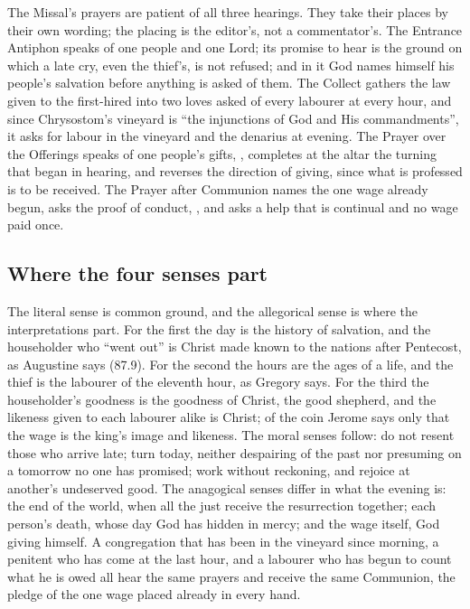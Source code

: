 The Missal's prayers are patient of all three hearings. They take their
places by their own wording; the placing is the editor's, not a
commentator's. The Entrance Antiphon speaks
of one people and one Lord; its promise to hear is the ground on which a late
cry, even the thief's, is not refused; and in it God names himself his
people's salvation before anything is asked of them. The Collect gathers the law given
to the first-hired into two loves asked of every labourer at every hour, and
since Chrysostom's vineyard is ``the injunctions of God and His
commandments'', it asks for labour in the vineyard and the denarius at
evening. The Prayer over the Offerings speaks of one people's
gifts, , completes at the altar the turning that began in
hearing, and reverses the direction of giving, since what is professed is to
be received. The Prayer after Communion names the one wage already begun, asks
the proof of conduct, , and asks a help that is continual
and no wage paid once.

\subsection{Where the four senses part}

The literal sense is common ground, and the allegorical sense is where the
interpretations part. For the first the day is the history of salvation, and
the householder who ``went out'' is Christ made known to the nations after
Pentecost, as Augustine says (87.9). For the second the hours are the ages of
a life, and the thief is the labourer of the eleventh hour, as Gregory says.
For the third the householder's goodness is the goodness of Christ, the good
shepherd, and the likeness given to each labourer alike is Christ; of the coin
Jerome says only that the wage is the king's image and likeness. The moral
senses follow: do not resent those who arrive late; turn today, neither
despairing of the past nor presuming on a tomorrow no one has promised; work
without reckoning, and rejoice at another's undeserved good. The anagogical
senses differ in what the evening is: the end of the world, when all the just
receive the resurrection together; each person's death, whose day God has
hidden in mercy; and the wage itself, God giving himself. A congregation that
has been in the vineyard since morning, a penitent who has come at the last hour, and a labourer who has
begun to count what he is owed all hear the same prayers and receive the same
Communion, the pledge of the one wage placed already in every hand.
